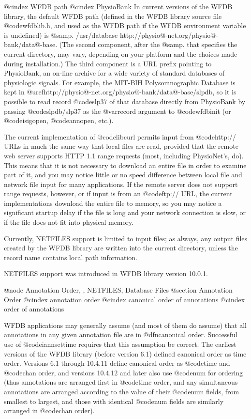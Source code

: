 {{{{{{{{{{{{{{@cindex WFDB path
@cindex PhysioBank
In current versions of the WFDB library, the default WFDB path (defined in the
WFDB library source file @code{wfdblib.h}, and used as the WFDB path if the
WFDB environment variable is undefined) is @samp{. /usr/database
http://physio@-net.org/physio@-bank/data@-base}.  (The second component,
after the @samp{.} that specifies the current directory, may vary, depending on
your platform and the choices made during installation.)  The third component
is a URL prefix pointing to PhysioBank, an on-line archive for a wide variety
of standard databases of physiologic signals.
For example, the MIT-BIH Polysomnographic Database is kept in
@uref{http://physio@-net.org/physio@-bank/data@-base/slpdb}, so it is
possible to read record @code{slp37} of that database directly from PhysioBank
by passing @code{slpdb/slp37} as the @var{record} argument to @code{wfdbinit}
(or @code{isigopen}, @code{annopen}, etc.).

The current implementation of @code{libcurl} permits input from @code{http://}
URLs in much the same way that local files are read, provided that the remote
web server supports HTTP 1.1 range requests (most, including PhysioNet's, do).
This means that it is not necessary to download an entire file in order to
examine part of it, and you may notice little or no speed difference between
local file and network file input for many applications.  If the remote server
does not support range requests, however, or if input is from an @code{ftp://}
URL, the current implementations download the entire file to memory, so you may
notice a significant startup delay if the file is long and your network
connection is slow, or if the file does not fit into physical memory.

Currently, NETFILES support is limited to input files; as always, any output
files created by the WFDB library are written into the current directory,
unless the record name contains local path information.

NETFILES support was introduced in WFDB library version 10.0.1.

@node     Annotation Order, , NETFILES, Database Files
@section Annotation Order
@cindex annotation order
@cindex canonical order of annotations
@cindex order of annotations

WFDB applications may generally assume (and most of them do assume) that all
annotations in any given annotation file are in @dfn{canonical order}.
Successful use of @code{iannsettime} requires that this assumption be correct.
The earliest versions of the WFDB library (before version 6.1) defined
canonical order as time order.  Versions 6.1 through 10.4.11 define canonical
order as @code{time} and @code{chan} order, and versions 10.4.12 and later also
use @code{num} for ordering (thus annotations are arranged first in @code{time}
order, and any simultaneous annotations are arranged according to the value of
their @code{num} fields, from smallest to largest, and those with identical
@code{num} fields are similarly arranged in @code{chan} order).

}}}}}}}}}}}}}}
